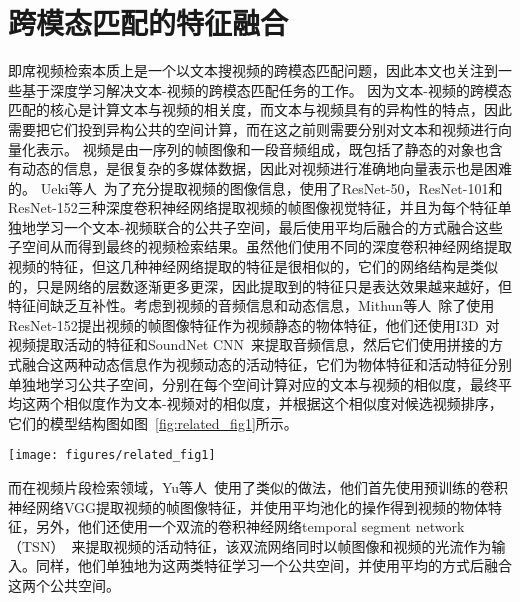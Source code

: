 \section{跨模态匹配的特征融合}
即席视频检索本质上是一个以文本搜视频的跨模态匹配问题，因此本文也关注到一些基于深度学习解决文本-视频的跨模态匹配任务的工作。
因为文本-视频的跨模态匹配的核心是计算文本与视频的相关度，而文本与视频具有的异构性的特点，因此需要把它们投到异构公共的空间计算，而在这之前则需要分别对文本和视频进行向量化表示。
视频是由一序列的帧图像和一段音频组成，既包括了静态的对象也含有动态的信息，是很复杂的多媒体数据，因此对视频进行准确地向量表示也是困难的。
Ueki等人~\cite{ueki2019waseda}为了充分提取视频的图像信息，使用了ResNet-50，ResNet-101和ResNet-152三种深度卷积神经网络提取视频的帧图像视觉特征，并且为每个特征单独地学习一个文本-视频联合的公共子空间，最后使用平均后融合的方式融合这些子空间从而得到最终的视频检索结果。虽然他们使用不同的深度卷积神经网络提取视频的特征，但这几种神经网络提取的特征是很相似的，它们的网络结构是类似的，只是网络的层数逐渐更多更深，因此提取到的特征只是表达效果越来越好，但特征间缺乏互补性。考虑到视频的音频信息和动态信息，Mithun等人~\cite{mithun2018learning}除了使用ResNet-152提出视频的帧图像特征作为视频静态的物体特征，他们还使用I3D~\cite{carreira2017quo}对视频提取活动的特征和SoundNet CNN~\cite{aytar2016soundnet}来提取音频信息，然后它们使用拼接的方式融合这两种动态信息作为视频动态的活动特征，它们为物体特征和活动特征分别单独地学习公共子空间，分别在每个空间计算对应的文本与视频的相似度，最终平均这两个相似度作为文本-视频对的相似度，并根据这个相似度对候选视频排序，它们的模型结构图如图~\ref{fig:related_fig1}所示。

\begin{figure*}[tbh!]
    \centering
    \texttt{[image: figures/related\_fig1]}
    \caption[Mithun等人的活动-文本空间和物体-文本空间模型结构图]{\textbf{活动-文本空间和物体-文本空间模型结构图}，来自~\cite{mithun2018learning}。}
    \label{fig:related_fig1}
\end{figure*}

而在视频片段检索领域，Yu等人~\cite{vsrel2020}使用了类似的做法，他们首先使用预训练的卷积神经网络VGG提取视频的帧图像特征，并使用平均池化的操作得到视频的物体特征，另外，他们还使用一个双流的卷积神经网络temporal segment network（TSN）~\cite{wang2016temporal}来提取视频的活动特征，该双流网络同时以帧图像和视频的光流作为输入。同样，他们单独地为这两类特征学习一个公共空间，并使用平均的方式后融合这两个公共空间。


